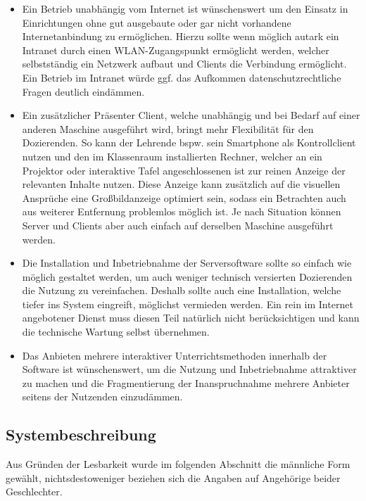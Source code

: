 \begin{itemize}
	\item Ein Betrieb unabhängig vom Internet ist wünschenswert um den Einsatz in Einrichtungen ohne gut ausgebaute oder gar nicht vorhandene Internetanbindung zu ermöglichen. Hierzu sollte wenn möglich autark ein Intranet durch einen WLAN-Zugangspunkt ermöglicht werden, welcher selbstständig ein Netzwerk aufbaut und Clients die Verbindung ermöglicht. Ein Betrieb im Intranet würde ggf. das Aufkommen datenschutzrechtliche Fragen deutlich eindämmen.
	\item Ein zusätzlicher Präsenter Client, welche unabhängig und bei Bedarf auf einer anderen Maschine ausgeführt wird, bringt mehr Flexibilität für den Dozierenden. So kann der Lehrende bspw. sein Smartphone als Kontrollclient nutzen und den im Klassenraum installierten Rechner, welcher an ein Projektor oder interaktive Tafel angeschlossenen ist zur reinen Anzeige der relevanten Inhalte nutzen. Diese Anzeige kann zusätzlich auf die visuellen Ansprüche eine Großbildanzeige optimiert sein, sodass ein Betrachten auch aus weiterer Entfernung problemlos möglich ist. Je nach Situation können Server und Clients aber auch einfach auf derselben Maschine ausgeführt werden. 
	\item Die Installation und Inbetriebnahme der Serversoftware sollte so einfach wie möglich gestaltet werden, um auch weniger technisch versierten Dozierenden die Nutzung zu vereinfachen. Deshalb sollte auch eine Installation, welche tiefer ins System eingreift, möglichst vermieden werden. Ein rein im Internet angebotener Dienst muss diesen Teil natürlich nicht berücksichtigen und kann die technische Wartung selbst übernehmen.
	\item Das Anbieten mehrere interaktiver Unterrichtsmethoden innerhalb der Software ist wünschenswert, um die Nutzung und Inbetriebnahme attraktiver zu machen und die Fragmentierung der Inanspruchnahme mehrere Anbieter seitens der Nutzenden einzudämmen. 
\end{itemize}






\subsection{Systembeschreibung}\label{sec:sysbeschreib}
Aus Gründen der Lesbarkeit wurde im folgenden Abschnitt die männliche Form gewählt, nichtsdestoweniger beziehen sich die Angaben auf Angehörige beider Geschlechter. \\ 

